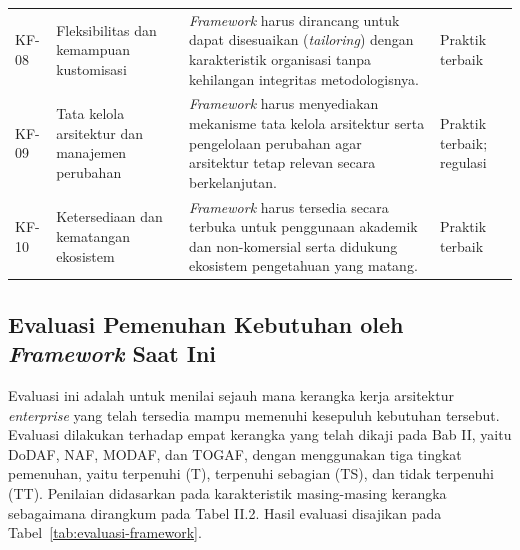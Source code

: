 \begin{longtable}{@{}p{}p{}p{}p{}@{}}
\addlinespace
KF-08 & Fleksibilitas dan kemampuan kustomisasi & \textit{Framework} harus dirancang untuk dapat disesuaikan (\textit{tailoring}) dengan karakteristik organisasi tanpa kehilangan integritas metodologisnya. & Praktik terbaik\\
\addlinespace
KF-09 & Tata kelola arsitektur dan manajemen perubahan & \textit{Framework} harus menyediakan mekanisme tata kelola arsitektur serta pengelolaan perubahan agar arsitektur tetap relevan secara berkelanjutan. & Praktik terbaik; regulasi\\
\addlinespace
KF-10 & Ketersediaan dan kematangan ekosistem & \textit{Framework} harus tersedia secara terbuka untuk penggunaan akademik dan non-komersial serta didukung ekosistem pengetahuan yang matang. & Praktik terbaik\\
\end{longtable}

\subsection{Evaluasi Pemenuhan Kebutuhan oleh \textit{Framework} Saat Ini}

Evaluasi ini adalah untuk menilai sejauh mana kerangka kerja arsitektur \textit{enterprise} yang telah tersedia mampu memenuhi kesepuluh kebutuhan tersebut. Evaluasi dilakukan terhadap empat kerangka yang telah dikaji pada Bab II, yaitu DoDAF, NAF, MODAF, dan TOGAF, dengan menggunakan tiga tingkat pemenuhan, yaitu terpenuhi (T), terpenuhi sebagian (TS), dan tidak terpenuhi (TT). Penilaian didasarkan pada karakteristik masing-masing kerangka sebagaimana dirangkum pada Tabel II.2. Hasil evaluasi disajikan pada Tabel~\ref{tab:evaluasi-framework}.

